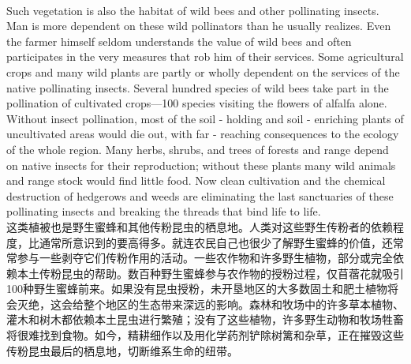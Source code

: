 \documentclass{article}
\begin{document}
\\
Such vegetation is also the habitat of wild bees and other pollinating insects. Man is more dependent on these wild pollinators than he usually realizes. Even the farmer himself seldom understands the value of wild bees and often participates in the very measures that rob him of their services. Some agricultural crops and many wild plants are partly or wholly dependent on the services of the native pollinating insects. Several hundred species of wild bees take part in the pollination of cultivated crops—100 species visiting the flowers of alfalfa alone. Without insect pollination, most of the soil - holding and soil - enriching plants of uncultivated areas would die out, with far - reaching consequences to the ecology of the whole region. Many herbs, shrubs, and trees of forests and range depend on native insects for their reproduction; without these plants many wild animals and range stock would find little food. Now clean cultivation and the chemical destruction of hedgerows and weeds are eliminating the last sanctuaries of these pollinating insects and breaking the threads that bind life to life.\\
这类植被也是野生蜜蜂和其他传粉昆虫的栖息地。人类对这些野生传粉者的依赖程度，比通常所意识到的要高得多。就连农民自己也很少了解野生蜜蜂的价值，还常常参与一些剥夺它们传粉作用的活动。一些农作物和许多野生植物，部分或完全依赖本土传粉昆虫的帮助。数百种野生蜜蜂参与农作物的授粉过程，仅苜蓿花就吸引100种野生蜜蜂前来。如果没有昆虫授粉，未开垦地区的大多数固土和肥土植物将会灭绝，这会给整个地区的生态带来深远的影响。森林和牧场中的许多草本植物、灌木和树木都依赖本土昆虫进行繁殖；没有了这些植物，许多野生动物和牧场牲畜将很难找到食物。如今，精耕细作以及用化学药剂铲除树篱和杂草，正在摧毁这些传粉昆虫最后的栖息地，切断维系生命的纽带。\\  
\end{document}

